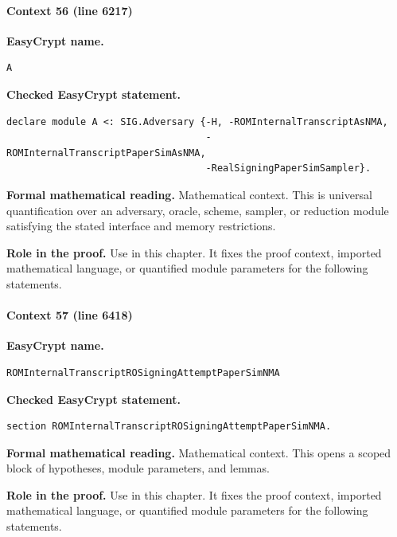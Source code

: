 \paragraph{Context 56 (line 6217)}
\noindent\textbf{EasyCrypt name.}
\begin{lstlisting}[language=EasyCrypt,basicstyle=\ttfamily\scriptsize]
A
\end{lstlisting}
\noindent\textbf{Checked EasyCrypt statement.}
\begin{lstlisting}[language=EasyCrypt,basicstyle=\ttfamily\scriptsize]
declare module A <: SIG.Adversary {-H, -ROMInternalTranscriptAsNMA,
                                   -ROMInternalTranscriptPaperSimAsNMA,
                                   -RealSigningPaperSimSampler}.
\end{lstlisting}
\noindent\textbf{Formal mathematical reading.}
Mathematical context. This is universal quantification over an adversary, oracle, scheme, sampler, or reduction module satisfying the stated interface and memory restrictions.

\noindent\textbf{Role in the proof.}
Use in this chapter. It fixes the proof context, imported mathematical language, or quantified module parameters for the following statements.

\paragraph{Context 57 (line 6418)}
\noindent\textbf{EasyCrypt name.}
\begin{lstlisting}[language=EasyCrypt,basicstyle=\ttfamily\scriptsize]
ROMInternalTranscriptROSigningAttemptPaperSimNMA
\end{lstlisting}
\noindent\textbf{Checked EasyCrypt statement.}
\begin{lstlisting}[language=EasyCrypt,basicstyle=\ttfamily\scriptsize]
section ROMInternalTranscriptROSigningAttemptPaperSimNMA.
\end{lstlisting}
\noindent\textbf{Formal mathematical reading.}
Mathematical context. This opens a scoped block of hypotheses, module parameters, and lemmas.

\noindent\textbf{Role in the proof.}
Use in this chapter. It fixes the proof context, imported mathematical language, or quantified module parameters for the following statements.

